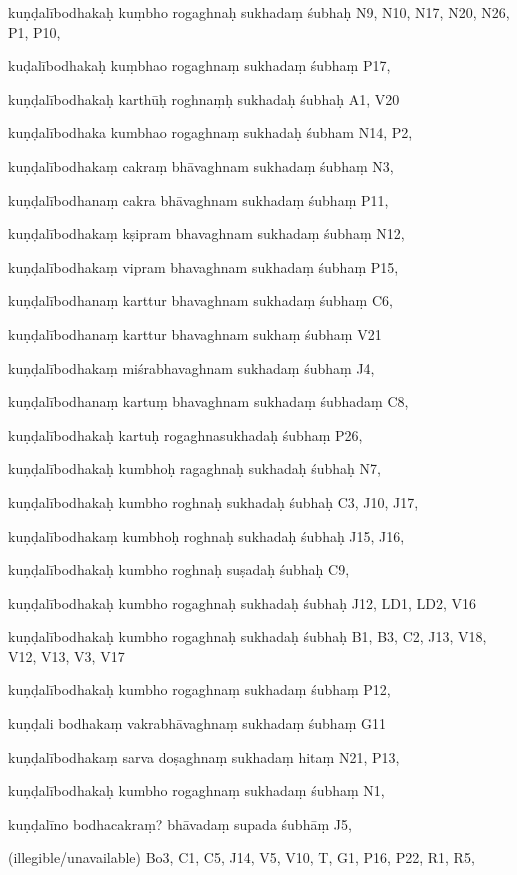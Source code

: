 \begin{marma}[hp02_009]
\begin{marma}[hp02_011]
\begin{marma}[hp02_67ab]
\item[kuṇḍalībodhakaḥ kuṃbho rogaghnaḥ sukhadaṃ śubhaḥ] N9, N10, N17, N20,  N26, P1, P10, 
\item[kuḍalībodhakaḥ kuṃbhao rogaghnaṃ sukhadaṃ śubhaṃ] P17,
\item[kuṇḍalībodhakaḥ karthūḥ roghnaṃḥ sukhadaḥ śubhaḥ] A1, V20
\item[kuṇḍalībodhaka kumbhao rogaghnaṃ sukhadaḥ śubham] N14, P2,
\item[kuṇḍalībodhakaṃ cakraṃ bhāvaghnam sukhadaṃ śubhaṃ] N3,
\item[kuṇḍalībodhanaṃ cakra bhāvaghnam sukhadaṃ śubhaṃ] P11,  
\item[kuṇḍalībodhakaṃ kṣipram bhavaghnam sukhadaṃ śubhaṃ] N12,
\item[kuṇḍalībodhakaṃ vipram bhavaghnam sukhadaṃ śubhaṃ] P15,
\item[kuṇḍalībodhanaṃ karttur bhavaghnam sukhadaṃ śubhaṃ] C6,
\item[kuṇḍalībodhanaṃ karttur bhavaghnam sukhaṃ śubhaṃ] V21
\item[kuṇḍalībodhakaṃ miśrabhavaghnam sukhadaṃ śubhaṃ] J4,
\item[kuṇḍalībodhanaṃ kartuṃ bhavaghnam sukhadaṃ śubhadaṃ] C8,
\item[kuṇḍalībodhakaḥ kartuḥ rogaghnasukhadaḥ śubhaṃ] P26, 
\item[kuṇḍalībodhakaḥ kumbhoḥ ragaghnaḥ sukhadaḥ śubhaḥ] N7, 
\item[kuṇḍalībodhakaḥ kumbho roghnaḥ sukhadaḥ śubhaḥ] C3, J10, J17, 
\item[kuṇḍalībodhakaṃ kumbhoḥ roghnaḥ sukhadaḥ śubhaḥ] J15, J16,
\item[kuṇḍalībodhakaḥ kumbho roghnaḥ suṣadaḥ śubhaḥ] C9, 
\item[kuṇḍalībodhakaḥ kumbho rogaghnaḥ sukhadaḥ śubhaḥ] J12, LD1, LD2, V16 
\item[kuṇḍalībodhakaḥ kumbho rogaghnaḥ sukhadaḥ śubhaḥ] B1, B3, C2, J13, V18, V12, V13, V3, V17 
\item[kuṇḍalībodhakaḥ kumbho rogaghnaṃ sukhadaṃ śubhaṃ] P12,
\item[kuṇḍali bodhakaṃ vakrabhāvaghnaṃ sukhadaṃ śubhaṃ] G11
\item[kuṇḍalībodhakaṃ sarva doṣaghnaṃ sukhadaṃ hitaṃ] N21, P13, 
\item[kuṇḍalībodhakaḥ kumbho rogaghnaṃ sukhadaṃ śubhaṃ] N1, 
\item[kuṇḍalīno bodhacakraṃ? bhāvadaṃ supada śubhāṃ] J5,
\item[(illegible/unavailable)] Bo3, C1, C5, J14, V5, V10, T, G1, P16, P22, R1, R5,
  \begin{description}


\end{description}
\end{marma}
\end{marma}
\end{marma}
